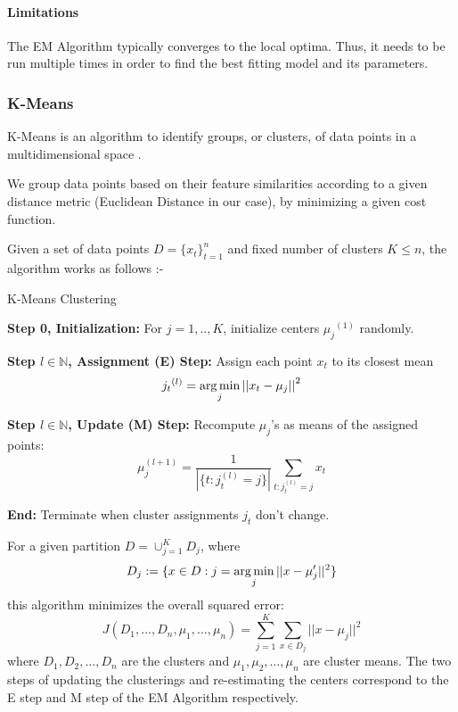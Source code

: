 \paragraph{Limitations}

The EM Algorithm typically converges to the local optima. Thus, it needs to be run multiple times in order to find the best fitting model and its parameters.

\subsubsection{K-Means}

K-Means is an algorithm to identify groups, or clusters, of data points in a multidimensional space \cite{bishop2006pattern}. 

We group data points based on their feature similarities according to a given distance metric (Euclidean Distance in our case), by minimizing a given cost function. 

Given a set of data points $D = \{x_t\}^n_{t=1}$ and fixed number of clusters $K \leq n$, the algorithm works as follows \cite{TanVYF}:-

\begin{algorithm}[h]
\caption{K-Means Clustering}

        \item \textbf{Step 0, Initialization:} For $j=1,..,K$, initialize centers ${\mu_j}^{(1)}$ randomly.
        \item \textbf{Step $l \in \mathbb{N}$, Assignment (E) Step:} Assign each point $x_t$ to its closest mean
        \begin{equation*}
            {j_t}^{(l)} = \operatorname*{arg\,min}_j {||x_t-\mu_j||}^2
        \end{equation*}
        \item \textbf{Step $l \in \mathbb{N}$, Update (M) Step:} Recompute $\mu_j$'s as means of the assigned points:
        \begin{equation*}
            \mu_j^{(l+1)} = \frac{1} { | \{ t : j_t^{(l)} =j\}|} \sum_{t : j_t^{(l)}=j} {x_t}
        \end{equation*}
        \item \textbf{End:} Terminate when cluster assignments $j_t$ don't change.
    
\end{algorithm}

For a given partition $D = \cup_{j=1}^{K} D_j$,
where 
\begin{equation*}
    D_j:= \{ x \in D : j = \operatorname*{arg\,min}_{j} ||x-\mu_j'||^2 \}
\end{equation*}
this algorithm minimizes the overall squared error:
    \begin{equation}
        J(D_1,\dots,D_n,\mu_1,\dots,\mu_n)
        = \sum_{j=1}^K \sum_{x \in D_j}{{||x - \mu_j||}^2}
    \end{equation} \label{eq:k_means_cost}
where $D_1,D_2,\dots,D_n$ are the clusters and $\mu_1,\mu_2,\dots,\mu_n$ are cluster means. The two steps of updating the clusterings and re-estimating the centers correspond to the E step and M step of the EM Algorithm respectively.

